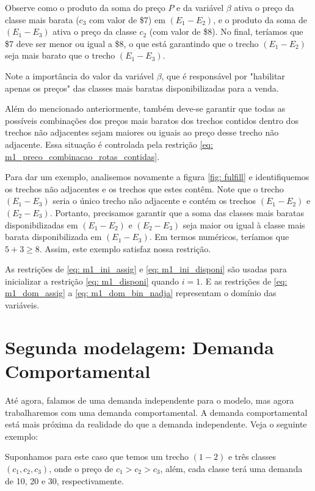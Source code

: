 Observe como o produto da soma do preço $P$ e da variável $\beta$ ativa o preço da classe mais barata ($c_3$ com valor de \$7) em $(E_1-E_2)$, e o produto da soma de $(E_1-E_3)$ ativa o preço da classe $c_2$ (com valor de \$8). No final, teríamos que \$7 deve ser menor ou igual a \$8, o que está garantindo que o trecho $(E_1-E_2)$ seja mais barato que o trecho $(E_1-E_3)$.

Note a importância do valor da variável $\beta$, que é responsável por "habilitar apenas os preços" das classes mais baratas disponibilizadas para a venda.

Além do mencionado anteriormente, também deve-se garantir que todas as possíveis combinações dos preços mais baratos dos trechos contidos dentro dos trechos não adjacentes sejam maiores ou iguais ao preço desse trecho não adjacente. Essa situação é controlada pela restrição \ref{eq: m1_preco_combinacao_rotas_contidas}.

Para dar um exemplo, analisemos novamente a figura \ref{fig: fulfill} e identifiquemos os trechos não adjacentes e os trechos que estes contêm. Note que o trecho $(E_1-E_3)$ seria o único trecho não adjacente e contém os trechos $(E_1-E_2)$ e $(E_2-E_3)$. Portanto, precisamos garantir que a soma das classes mais baratas disponibilizadas em $(E_1-E_2)$ e $(E_2-E_3)$ seja maior ou igual à classe mais barata disponibilizada em $(E_1-E_3)$. Em termos numéricos, teríamos que $5+3 \geq 8$. Assim, este exemplo satisfaz nossa restrição.

As restrições de \ref{eq: m1_ini_assig} e \ref{eq: m1_ini_disponi} são usadas para inicializar a restrição \ref{eq: m1_disponi} quando \(i = 1\). E as restrições de \ref{eq: m1_dom_assig} a \ref{eq: m1_dom_bin_nadja} representam o domínio das variáveis.


\section{Segunda modelagem: Demanda Comportamental} \label{sec: modelagemComportamental}

Até agora, falamos de uma demanda independente para o modelo, mas agora trabalharemos com uma demanda comportamental. A demanda comportamental está mais próxima da realidade do que a demanda independente. Veja o seguinte exemplo:

Suponhamos para este caso que temos um trecho $(1-2)$ e três classes $(c_1, c_2, c_3)$, onde o preço de $c_1 > c_2 > c_3$, além, cada classe terá uma demanda de 10, 20 e 30, respectivamente.

